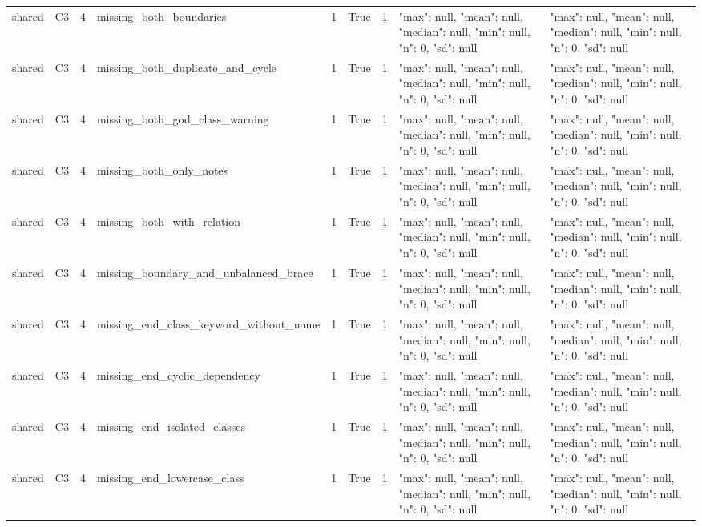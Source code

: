 \begin{tabular}{lllllllll}
shared & C3 & 4 & missing\_both\_boundaries & 1 & True & 1 & {"max": null, "mean": null, "median": null, "min": null, "n": 0, "sd": null} & {"max": null, "mean": null, "median": null, "min": null, "n": 0, "sd": null} \\
shared & C3 & 4 & missing\_both\_duplicate\_and\_cycle & 1 & True & 1 & {"max": null, "mean": null, "median": null, "min": null, "n": 0, "sd": null} & {"max": null, "mean": null, "median": null, "min": null, "n": 0, "sd": null} \\
shared & C3 & 4 & missing\_both\_god\_class\_warning & 1 & True & 1 & {"max": null, "mean": null, "median": null, "min": null, "n": 0, "sd": null} & {"max": null, "mean": null, "median": null, "min": null, "n": 0, "sd": null} \\
shared & C3 & 4 & missing\_both\_only\_notes & 1 & True & 1 & {"max": null, "mean": null, "median": null, "min": null, "n": 0, "sd": null} & {"max": null, "mean": null, "median": null, "min": null, "n": 0, "sd": null} \\
shared & C3 & 4 & missing\_both\_with\_relation & 1 & True & 1 & {"max": null, "mean": null, "median": null, "min": null, "n": 0, "sd": null} & {"max": null, "mean": null, "median": null, "min": null, "n": 0, "sd": null} \\
shared & C3 & 4 & missing\_boundary\_and\_unbalanced\_brace & 1 & True & 1 & {"max": null, "mean": null, "median": null, "min": null, "n": 0, "sd": null} & {"max": null, "mean": null, "median": null, "min": null, "n": 0, "sd": null} \\
shared & C3 & 4 & missing\_end\_class\_keyword\_without\_name & 1 & True & 1 & {"max": null, "mean": null, "median": null, "min": null, "n": 0, "sd": null} & {"max": null, "mean": null, "median": null, "min": null, "n": 0, "sd": null} \\
shared & C3 & 4 & missing\_end\_cyclic\_dependency & 1 & True & 1 & {"max": null, "mean": null, "median": null, "min": null, "n": 0, "sd": null} & {"max": null, "mean": null, "median": null, "min": null, "n": 0, "sd": null} \\
shared & C3 & 4 & missing\_end\_isolated\_classes & 1 & True & 1 & {"max": null, "mean": null, "median": null, "min": null, "n": 0, "sd": null} & {"max": null, "mean": null, "median": null, "min": null, "n": 0, "sd": null} \\
shared & C3 & 4 & missing\_end\_lowercase\_class & 1 & True & 1 & {"max": null, "mean": null, "median": null, "min": null, "n": 0, "sd": null} & {"max": null, "mean": null, "median": null, "min": null, "n": 0, "sd": null} \\

\end{tabular}
